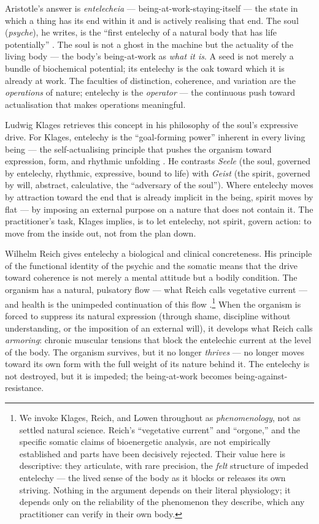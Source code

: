 Aristotle's answer is \emph{entelecheia} --- being-at-work-staying-itself --- the
state in which a thing has its end within it and is actively realising that end.
The soul (\emph{psyche}), he writes, is the ``first entelechy of a natural body
that has life potentially'' \parencite[II.1]{aristotle1986anima}. The soul is not a ghost in the machine but the
actuality of the living body --- the body's being-at-work as \emph{what it is}.
A seed is not merely a bundle of biochemical potential; its entelechy is the
oak toward which it is already at work. The faculties of distinction, coherence,
and variation are the \emph{operations} of nature; entelechy is the
\emph{operator} --- the continuous push toward actualisation that makes
operations meaningful.

Ludwig Klages retrieves this concept in his philosophy of the soul's expressive
drive. For Klages, entelechy is the ``goal-forming power'' inherent in every
living being --- the self-actualising principle that pushes the organism toward
expression, form, and rhythmic unfolding \parencite{klages1929geist}. He
contrasts \emph{Seele} (the soul, governed by entelechy, rhythmic, expressive,
bound to life) with \emph{Geist} (the spirit, governed by will, abstract,
calculative, the ``adversary of the soul''). Where entelechy moves by attraction
toward the end that is already implicit in the being, spirit moves by
flat --- by imposing an external purpose on a nature that does not contain it.
The practitioner's task, Klages implies, is to let entelechy, not spirit, govern
action: to move from the inside out, not from the plan down.

Wilhelm Reich gives entelechy a biological and clinical concreteness. His
principle of the functional identity of the psychic and the somatic means that
the drive toward coherence is not merely a mental attitude but a bodily
condition. The organism has a natural, pulsatory flow --- what Reich calls
vegetative current --- and health is the unimpeded continuation of this flow
\parencite{reich1933character}.\footnote{We invoke Klages, Reich, and Lowen
throughout as \emph{phenomenology}, not as settled natural science. Reich's
``vegetative current'' and ``orgone,'' and the specific somatic claims of
bioenergetic analysis, are not empirically established and parts have been
decisively rejected. Their value here is descriptive: they articulate, with rare
precision, the \emph{felt} structure of impeded entelechy --- the lived sense of
the body as it blocks or releases its own striving. Nothing in the argument
depends on their literal physiology; it depends only on the reliability of the
phenomenon they describe, which any practitioner can verify in their own body.}
When the organism is forced to suppress
its natural expression (through shame, discipline without understanding, or the
imposition of an external will), it develops what Reich calls \emph{armoring}:
chronic muscular tensions that block the entelechic current at the level of the
body. The organism survives, but it no longer \emph{thrives} --- no longer moves
toward its own form with the full weight of its nature behind it. The entelechy
is not destroyed, but it is impeded; the being-at-work becomes being-against-
resistance.

